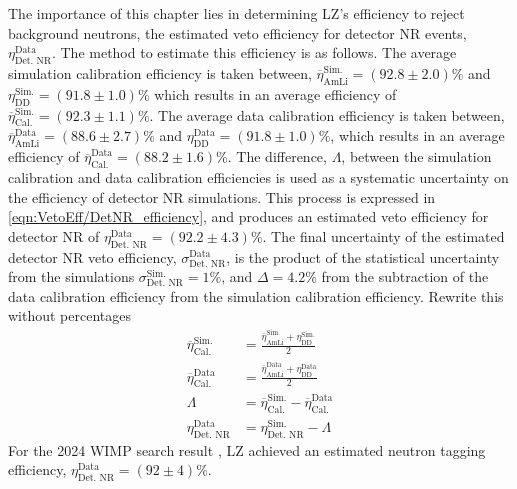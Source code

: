 The importance of this chapter lies in determining LZ's efficiency to reject background neutrons, the estimated veto efficiency for detector NR events, $\eta_{\text{Det. NR}}^{\text{Data}}$. The method to estimate this efficiency is as follows. 
The average simulation calibration efficiency is taken between, $\overline{\eta}_{\text{AmLi}}^{\text{Sim.}}=(92.8\pm2.0)\%$ and $\eta_{\text{DD}}^{\text{Sim.}}=(91.8\pm1.0)\%$ which results in an average efficiency of $\overline{\eta}_{\text{Cal.}}^{\text{Sim.}}=(92.3\pm1.1)\%$.
The average data calibration efficiency is taken between, $\overline{\eta}_{\text{AmLi}}^{\text{Data}}=(88.6\pm2.7)\%$ and $\eta_{\text{DD}}^{\text{Data}}=(91.8\pm1.0)\%$, which results in an average efficiency of $\overline{\eta}_{\text{Cal.}}^{\text{Data}}=(88.2\pm1.6)\%$.
The difference, $\Lambda$, between the simulation calibration and data calibration efficiencies is used as a systematic uncertainty on the efficiency of detector NR simulations.
This process is expressed in \autoref{eqn:VetoEff/DetNR_efficiency}, and produces an estimated veto efficiency for detector NR of $\eta_{\text{Det. NR}}^\text{Data}=(92.2\pm4.3)\%$.
The final uncertainty of the estimated detector NR veto efficiency, $\sigma^\text{Data}_\text{Det. NR}$, is the product of the statistical uncertainty from the simulations $\sigma^\text{Sim.}_\text{Det. NR}=1\%$, and $\Delta=4.2\%$ from the subtraction of the data calibration efficiency from the simulation calibration efficiency. {\color{red}Rewrite this without percentages}
\begin{equation}
    \label{eqn:VetoEff/DetNR_efficiency}
    \begin{split}
    	\overline{\eta}_{\text{Cal.}}^{\text{Sim.}} & = \frac{\overline{\eta}_{\text{AmLi}}^{\text{Sim.}}+\eta_{\text{DD}}^{\text{Sim.}}}{2}\\
    	\overline{\eta}_{\text{Cal.}}^{\text{Data}} & = \frac{\overline{\eta}_{\text{AmLi}}^{\text{Data}}+\eta_{\text{DD}}^{\text{Data}}}{2} \\
    	\Lambda &= \overline{\eta}_{\text{Cal.}}^{\text{Sim.}} - \overline{\eta}_{\text{Cal.}}^{\text{Data}}\\
    	\eta_\text{Det. NR}^\text{Data}   & = \eta_\text{Det. NR}^\text{Sim.} - \Lambda
    \end{split}
\end{equation}
For the 2024 WIMP search result \cite{LZCollaboration:2024lux}, LZ achieved an estimated neutron tagging efficiency, $\eta_\text{Det. NR}^\text{Data}=(92\pm4)\%$.

